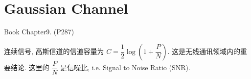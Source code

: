 \chapter{Gaussian Channel}

Book Chapter9. (P287)

连续信号, 高斯信道的信道容量为 $C = \dfrac{1}{2} \log\left(1+\dfrac{P}{N}\right)$. 这是无线通讯领域内的重要结论. 这里的 $\dfrac{P}{N}$ 是信噪比, i.e. Signal to Noise Ratio (SNR).


